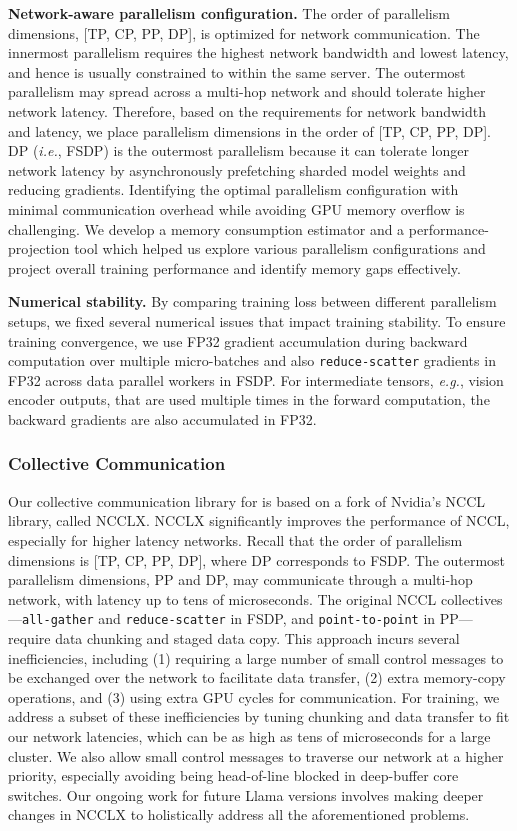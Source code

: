 \documentclass[dvipsnames]{fairmeta}
\begin{document}
\textbf{Network-aware parallelism configuration.} The order of parallelism dimensions, [TP, CP, PP, DP], is optimized for network communication. The innermost parallelism requires the highest network bandwidth and lowest latency, and hence is usually constrained to within the same server. The outermost parallelism may spread across a multi-hop network and should tolerate higher network latency. Therefore, based on the requirements for network bandwidth and latency, we place parallelism dimensions in the order of [TP, CP, PP, DP]. DP (\emph{i.e.}, FSDP) is the outermost parallelism because it can tolerate longer network latency by asynchronously prefetching sharded model weights and reducing gradients. Identifying the optimal parallelism configuration with minimal communication overhead while avoiding GPU memory overflow is challenging. We develop a memory consumption estimator and a performance-projection tool which helped us explore various parallelism configurations and project overall training performance and identify memory gaps effectively.

\textbf{Numerical stability.} By comparing training loss between different parallelism setups, we fixed several numerical issues that impact training stability. To ensure training convergence, we use FP32 gradient accumulation during backward computation over multiple micro-batches and also \texttt{reduce-scatter} gradients in FP32 across data parallel workers in FSDP. For intermediate tensors, \emph{e.g.}, vision encoder outputs, that are used multiple times in the forward computation, the backward gradients are also accumulated in FP32.

\subsubsection{Collective Communication}
\label{sec:ncclx}

Our collective communication library for \llamathree is based on a fork of Nvidia's NCCL library, called NCCLX. NCCLX significantly improves the performance of NCCL, especially for higher latency networks. Recall that the order of parallelism dimensions is [TP, CP, PP, DP], where DP corresponds to FSDP. The outermost parallelism dimensions, PP and DP, may communicate through a multi-hop network, with latency up to tens of microseconds. The original NCCL collectives---\texttt{all-gather} and \texttt{reduce-scatter} in FSDP, and \texttt{point-to-point} in PP---require data chunking and staged data copy. This approach incurs several inefficiencies, including (1) requiring a large number of small control messages to be exchanged over the network to facilitate data transfer, (2) extra memory-copy operations, and (3) using extra GPU cycles for communication.  For \llamathree training, we address a subset of these inefficiencies by tuning chunking and data transfer to fit our network latencies, which can be as high as tens of microseconds for a large cluster. We also allow small control messages to traverse our network at a higher priority, especially avoiding being head-of-line blocked in deep-buffer core switches. Our ongoing work for future Llama versions involves making deeper changes in NCCLX to holistically address all the aforementioned problems.
\end{document}
